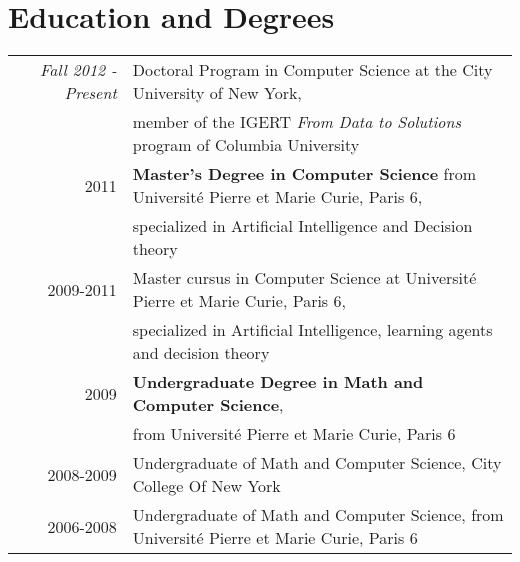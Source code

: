 \documentclass[a4paper,10pt]{article}
\begin{document}
\section{Education and Degrees}
    \vspace{0.2cm}
    \begin{tabular}{rl} 
        \emph{ ~~ Fall 2012 - Present} & Doctoral Program in Computer Science at the City University of New York, \\
        & member of the IGERT {\em From Data to Solutions} program of Columbia University \\
        \textsc{2011} & {\bfseries Master's Degree in Computer Science} from Université Pierre et Marie Curie, Paris 6,\\
        & specialized in Artificial Intelligence and Decision theory\\ 
        \textsc{2009-2011} & Master cursus in Computer Science at Université Pierre et Marie Curie, Paris 6, \\
        &  specialized in Artificial Intelligence, learning agents and decision theory \\
        \textsc{2009} & {\bfseries Undergraduate Degree in Math and Computer Science},\\
        & from Université Pierre et Marie Curie, Paris 6\\
        \textsc{2008-2009} & Undergraduate of Math and Computer Science, City College Of New York\\
        \textsc{2006-2008} & Undergraduate of Math and Computer Science, from Université Pierre et Marie Curie, Paris 6\\
    \end{tabular}\\
\end{document}
